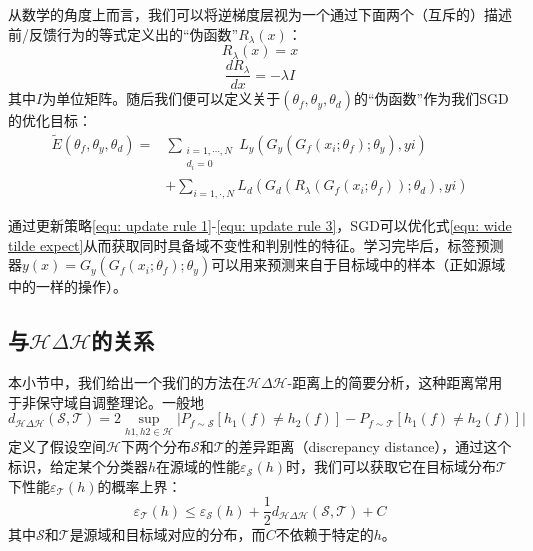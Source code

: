 \documentclass[UTF8]{ctexart}
\begin{document}
从数学的角度上而言，我们可以将逆梯度层视为一个通过下面两个（互斥的）描述前/反馈行为的等式定义出的“伪函数”$R_\lambda(x)$：
\begin{equation}
R_\lambda(x) = x
\end{equation}
\begin{equation}
\frac{dR_\lambda}{dx} = -\lambda I
\end{equation}
其中$I$为单位矩阵。随后我们便可以定义关于$(\theta_f, \theta_y, \theta_d)$的“伪函数”作为我们SGD的优化目标：
\begin{equation}
\begin{split}
\widetilde{E}(\theta_f, \theta_y, \theta_d) =& \sum\limits_{\substack{i=1, \cdots, N\\  d_i=0}}L_y(G_y(G_f(x_i;\theta_f);\theta_y),yi) \\
&+\sum\limits_{i=1, \cdot, N}L_d(G_d(R_\lambda(G_f(x_i; \theta_f)); \theta_d), yi)
\end{split}
\label{equ: wide tilde expect}
\end{equation}

通过更新策略\eqref{equ: update rule 1}-\eqref{equ: update rule 3}，SGD可以优化式\eqref{equ: wide tilde expect}从而获取同时具备域不变性和判别性的特征。学习完毕后，标签预测器$y(x) = G_y(G_f(x_i;\theta_f);\theta_y)$可以用来预测来自于目标域中的样本（正如源域中的一样的操作）。



\subsection{与$\mathcal{H}\Delta\mathcal{H}$的关系}
本小节中，我们给出一个我们的方法在$\mathcal{H}\Delta\mathcal{H}$-距离上的简要分析，这种距离常用于非保守域自调整理论。一般地
\begin{equation}
d_{\mathcal{H}\Delta\mathcal{H}}(\mathcal{S}, \mathcal{T}) = 2 \sup\limits_{h1, h2 \in \mathcal{H}} | P_{f\sim \mathcal{S}}[h_1(f) \neq h_2(f)] - P_{f\sim \mathcal{T}}[h_1(f) \neq h_2(f)]|
\end{equation}
定义了假设空间$\mathcal{H}$下两个分布$\mathcal{S}$和$\mathcal{T}$的差异距离（discrepancy distance），通过这个标识，给定某个分类器$h$在源域的性能$\varepsilon_\mathcal{S}(h)$时，我们可以获取它在目标域分布$\mathcal{T}$下性能$\varepsilon_\mathcal{T}(h)$的概率上界：
\begin{equation}
\varepsilon_\mathcal{T}(h) \leq \varepsilon_\mathcal{S}(h) + \frac{1}{2}d_{\mathcal{H}\Delta\mathcal{H}}(\mathcal{S}, \mathcal{T}) + C
\end{equation}
其中$\mathcal{S}$和$\mathcal{T}$是源域和目标域对应的分布，而$C$不依赖于特定的$h$。
\end{document}
